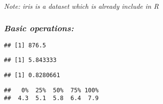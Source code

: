 \documentclass[
]{article}
\newenvironment{Shaded}{\begin{snugshade}}{\end{snugshade}}
\newcommand{\CommentTok}[1]{\textcolor[rgb]{0.56,0.35,0.01}{\textit{#1}}}
\newcommand{\FunctionTok}[1]{\textcolor[rgb]{0.13,0.29,0.53}{\textbf{#1}}}
\newcommand{\NormalTok}[1]{#1}
\newcommand{\OtherTok}[1]{\textcolor[rgb]{0.56,0.35,0.01}{#1}}
\newcommand{\SpecialCharTok}[1]{\textcolor[rgb]{0.81,0.36,0.00}{\textbf{#1}}}
\begin{document}
\emph{Note: iris is a dataset which is already include in R}

\hypertarget{basic-operations}{%
\subsubsection{\texorpdfstring{\emph{Basic
operations:}}{Basic operations:}}\label{basic-operations}}

\begin{Shaded}
\end{Shaded}

\begin{verbatim}
## [1] 876.5
\end{verbatim}

\begin{Shaded}
\end{Shaded}

\begin{verbatim}
## [1] 5.843333
\end{verbatim}

\begin{Shaded}
\end{Shaded}

\begin{verbatim}
## [1] 0.8280661
\end{verbatim}

\begin{Shaded}
\end{Shaded}

\begin{verbatim}
##   0%  25%  50%  75% 100% 
##  4.3  5.1  5.8  6.4  7.9
\end{verbatim}
\end{document}
